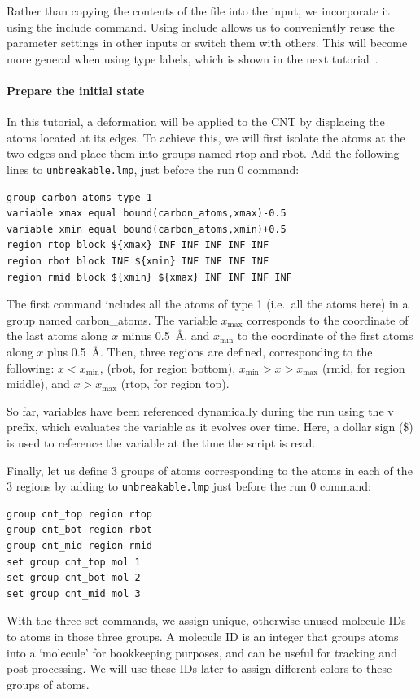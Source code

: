 \documentclass[9pt,tutorial]{livecoms}
\newcommand{\lmpcmd}[1]{\hspace{0pt}\colorbox{listing}{\textcolor{command}{\small{#1}}}\hspace{0pt}} %
\newcommand{\flecmd}[1]{\textcolor{command}{\texttt{#1}}} %
\begin{document}
\begin{note}
Rather than copying the contents of the file into the input, we
incorporate it using the \lmpcmd{include} command.  Using \lmpcmd{include} allows
us to conveniently reuse the parameter settings
in other inputs or switch them with others.  This will become more general
when using type labels, which is shown in the next
tutorial~\cite{gissinger2024type}.
\end{note}

\paragraph{Prepare the initial state}

In this tutorial, a deformation will be applied to the CNT by displacing
the atoms located at its edges.  To achieve this, we will first isolate the
atoms at the two edges and place them into groups named \lmpcmd{rtop} and
\lmpcmd{rbot}.  Add the following lines to \flecmd{unbreakable.lmp},
just before the \lmpcmd{run 0} command:
\begin{lstlisting}
group carbon_atoms type 1
variable xmax equal bound(carbon_atoms,xmax)-0.5
variable xmin equal bound(carbon_atoms,xmin)+0.5
region rtop block ${xmax} INF INF INF INF INF
region rbot block INF ${xmin} INF INF INF INF
region rmid block ${xmin} ${xmax} INF INF INF INF
\end{lstlisting}
The first command includes all the atoms of type 1 (i.e.~all the atoms here)
in a group named \lmpcmd{carbon\_atoms}.
The variable $x_\text{max}$ corresponds to the coordinate of the
last atoms along $x$ minus 0.5~Å, and $x_\text{min}$ to the coordinate
of the first atoms along $x$ plus 0.5~Å.  Then, three regions are defined,
corresponding to the following: $x < x_\text{min}$, (\lmpcmd{rbot}, for region
bottom), $x_\text{min} > x > x_\text{max}$ (\lmpcmd{rmid}, for region middle),
and $x > x_\text{max}$ (\lmpcmd{rtop}, for region top).

\begin{note}
{\color{blue}
So far, variables have been referenced dynamically during the run using
the \lmpcmd{v\_} prefix, which evaluates the variable as it evolves over time.
Here, a dollar sign (\$) is used to reference the variable at the time the script is read.}
\end{note}

Finally, let us define 3 groups of atoms corresponding to the atoms
in each of the 3 regions by adding to \flecmd{unbreakable.lmp}
just before the \lmpcmd{run 0} command:
\begin{lstlisting}
group cnt_top region rtop
group cnt_bot region rbot
group cnt_mid region rmid
set group cnt_top mol 1
set group cnt_bot mol 2
set group cnt_mid mol 3
\end{lstlisting}
With the three \lmpcmd{set} commands, we assign unique, otherwise unused molecule
IDs to atoms in those three groups.  {\color{blue}A molecule ID is an
integer that groups atoms into a `molecule' for bookkeeping purposes, and can be
useful for tracking and post-processing.}  We will use these IDs later to assign
different colors to these groups of atoms.
\end{document}

